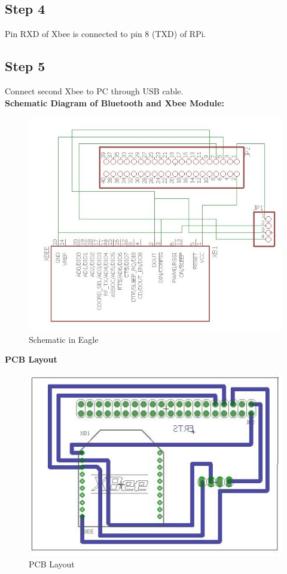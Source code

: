 \documentclass[a4paper,12pt,oneside]{book}
\begin{document}
\subsection*{Step 4}
Pin RXD of Xbee is connected to pin 8 (TXD) of RPi.
\subsection*{Step 5}
Connect second Xbee to PC through USB cable.\\ 

\textbf{Schematic Diagram of Bluetooth and Xbee Module:}\\
\begin{figure}[H]
    \centering
    \includegraphics[scale= 0.8]{zigbee_schematic}
    \caption{Schematic in Eagle}
\end{figure}
\newpage
\textbf{PCB Layout}\\
\begin{figure}[H]
    \centering
    \includegraphics[scale= 0.5]{zigbee_layout}
    \caption{PCB Layout}
\end{figure}
\end{document}
